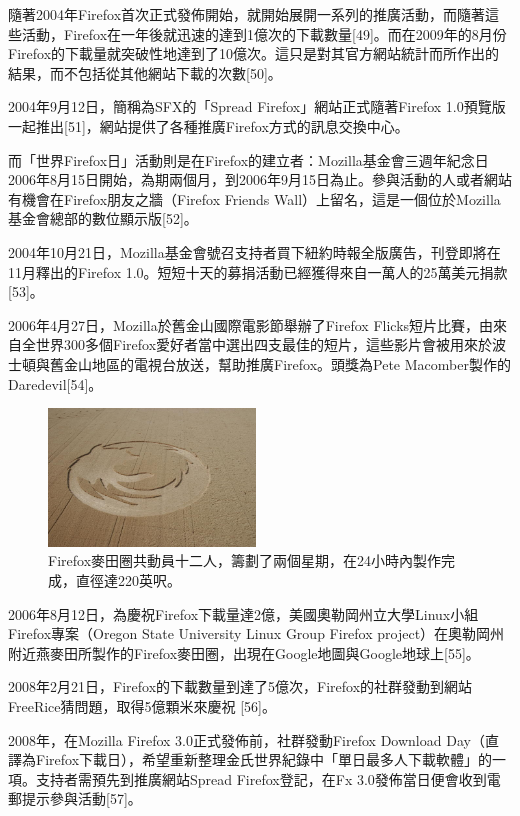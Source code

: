 \documentclass[12pt, a4paper]{article}
\begin{document}
隨著2004年Firefox首次正式發佈開始，就開始展開一系列的推廣活動，而隨著這些活動，Firefox在一年後就迅速的達到1億次的下載數量[49]。而在2009年的8月份Firefox的下載量就突破性地達到了10億次。這只是對其官方網站統計而所作出的結果，而不包括從其他網站下載的次數[50]。

2004年9月12日，簡稱為SFX的「Spread Firefox」網站正式隨著Firefox 1.0預覽版一起推出[51]，網站提供了各種推廣Firefox方式的訊息交換中心。

而「世界Firefox日」活動則是在Firefox的建立者：Mozilla基金會三週年紀念日2006年8月15日開始，為期兩個月，到2006年9月15日為止。參與活動的人或者網站有機會在Firefox朋友之牆（Firefox Friends Wall）上留名，這是一個位於Mozilla基金會總部的數位顯示版[52]。

2004年10月21日，Mozilla基金會號召支持者買下紐約時報全版廣告，刊登即將在11月釋出的Firefox 1.0。短短十天的募捐活動已經獲得來自一萬人的25萬美元捐款[53]。

2006年4月27日，Mozilla於舊金山國際電影節舉辦了Firefox Flicks短片比賽，由來自全世界300多個Firefox愛好者當中選出四支最佳的短片，這些影片會被用來於波士頓與舊金山地區的電視台放送，幫助推廣Firefox。頭獎為Pete Macomber製作的Daredevil[54]。

\begin{figure}
  \begin{center}
    \includegraphics[width=55mm]{Firefox_Crop_Circle}
  \end{center}
  \caption{Firefox麥田圈共動員十二人，籌劃了兩個星期，在24小時內製作完成，直徑達220英呎。}
\end{figure}

2006年8月12日，為慶祝Firefox下載量達2億，美國奧勒岡州立大學Linux小組Firefox專案（Oregon State University Linux Group Firefox project）在奧勒岡州附近燕麥田所製作的Firefox麥田圈，出現在Google地圖與Google地球上[55]。

2008年2月21日，Firefox的下載數量到達了5億次，Firefox的社群發動到網站FreeRice猜問題，取得5億顆米來慶祝 [56]。

2008年，在Mozilla Firefox 3.0正式發佈前，社群發動Firefox Download Day（直譯為Firefox下載日），希望重新整理金氏世界紀錄中「單日最多人下載軟體」的一項。支持者需預先到推廣網站Spread Firefox登記，在Fx 3.0發佈當日便會收到電郵提示參與活動[57]。
\end{document}
